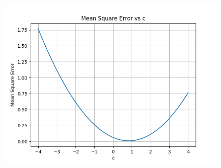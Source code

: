 \documentclass[journal,12pt,onecolumn]{IEEEtran}
\theoremstyle{remark}
\begin{document}
\begin{figure}[!ht]
	\centering
	\includegraphics[width = \columnwidth]{./figs/fig1.png}
\end{figure}
\end{document}
